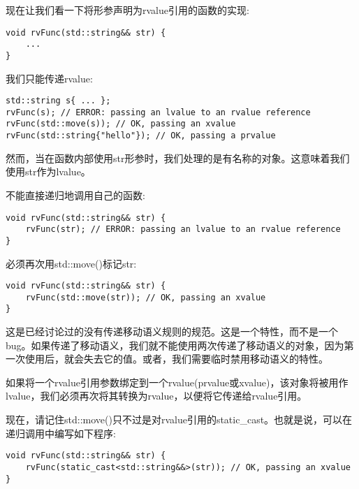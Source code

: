 现在让我们看一下将形参声明为rvalue引用的函数的实现:\par

\begin{lstlisting}[caption={}]
void rvFunc(std::string&& str) {
	...
}
\end{lstlisting}

我们只能传递rvalue:\par

\begin{lstlisting}[caption={}]
std::string s{ ... };
rvFunc(s); // ERROR: passing an lvalue to an rvalue reference
rvFunc(std::move(s)); // OK, passing an xvalue
rvFunc(std::string{"hello"}); // OK, passing a prvalue
\end{lstlisting}

然而，当在函数内部使用str形参时，我们处理的是有名称的对象。这意味着我们使用str作为lvalue。\par

不能直接递归地调用自己的函数:\par

\begin{lstlisting}[caption={}]
void rvFunc(std::string&& str) {
	rvFunc(str); // ERROR: passing an lvalue to an rvalue reference
}
\end{lstlisting}

必须再次用std::move()标记str:\par

\begin{lstlisting}[caption={}]
void rvFunc(std::string&& str) {
	rvFunc(std::move(str)); // OK, passing an xvalue
}
\end{lstlisting}

这是已经讨论过的没有传递移动语义规则的规范。这是一个特性，而不是一个bug。如果传递了移动语义，我们就不能使用两次传递了移动语义的对象，因为第一次使用后，就会失去它的值。或者，我们需要临时禁用移动语义的特性。\par

如果将一个rvalue引用参数绑定到一个rvalue(prvalue或xvalue)，该对象将被用作lvalue，我们必须再次将其转换为rvalue，以便将它传递给rvalue引用。\par

现在，请记住std::move()只不过是对rvalue引用的static\_cast。也就是说，可以在递归调用中编写如下程序:\par

\begin{lstlisting}[caption={}]
void rvFunc(std::string&& str) {
	rvFunc(static_cast<std::string&&>(str)); // OK, passing an xvalue
}
\end{lstlisting}


